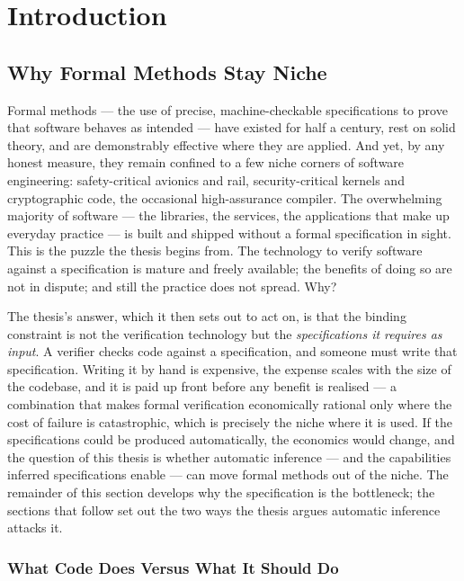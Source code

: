 \chapter{Introduction}
\label{ch:introduction}

\section{Why Formal Methods Stay Niche}

Formal methods --- the use of precise, machine-checkable specifications to prove
that software behaves as intended --- have existed for half a century, rest on
solid theory, and are demonstrably effective where they are applied. And yet, by
any honest measure, they remain confined to a few niche corners of software
engineering: safety-critical avionics and rail, security-critical kernels and
cryptographic code, the occasional high-assurance compiler. The overwhelming
majority of software --- the libraries, the services, the applications that make
up everyday practice --- is built and shipped without a formal specification in
sight. This is the puzzle the thesis begins from. The technology to verify
software against a specification is mature and freely available; the benefits of
doing so are not in dispute; and still the practice does not spread. Why?

The thesis's answer, which it then sets out to act on, is that the binding
constraint is not the verification technology but the \emph{specifications it
requires as input}. A verifier checks code against a specification, and someone
must write that specification. Writing it by hand is expensive, the expense
scales with the size of the codebase, and it is paid up front before any benefit
is realised --- a combination that makes formal verification economically
rational only where the cost of failure is catastrophic, which is precisely the
niche where it is used. If the specifications could be produced automatically,
the economics would change, and the question of this thesis is whether automatic
inference --- and the capabilities inferred specifications enable --- can move
formal methods out of the niche. The remainder of this section develops why the
specification is the bottleneck; the sections that follow set out the two ways
the thesis argues automatic inference attacks it.

\subsection{What Code Does Versus What It Should Do}

